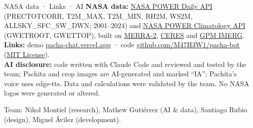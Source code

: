 \documentclass[10pt,a4paper]{article}
\newcommand{\enlace}[2]{\href{#1}{#2}}
\begin{document}
\begin{otherlanguage}{english}
\begin{tarjeta}[verde]{NASA data · Links · AI}
\small
\textbf{NASA data:} \enlace{https://power.larc.nasa.gov/docs/services/api/temporal/daily/}{NASA POWER Daily API}
(PRECTOTCORR, T2M\_MAX, T2M\_MIN, RH2M, WS2M, ALLSKY\_SFC\_SW\_DWN; 2001–2024) and
\enlace{https://power.larc.nasa.gov/docs/services/api/temporal/climatology/}{NASA POWER Climatology API} (GWETROOT, GWETTOP),
built on \enlace{https://gmao.gsfc.nasa.gov/reanalysis/MERRA-2/}{MERRA-2}, \enlace{https://ceres.larc.nasa.gov/}{CERES} and
\enlace{https://gpm.nasa.gov/data/imerg}{GPM IMERG}.\\[2pt]
\textbf{Links:} demo \enlace{https://pacha-chat.vercel.app}{pacha-chat.vercel.app} ·
code \enlace{https://github.com/M47H3W1/pacha-bot}{github.com/M47H3W1/pacha-bot} (\enlace{https://github.com/M47H3W1/pacha-bot/blob/develop/LICENSE}{MIT License}).\\[2pt]
\textbf{AI disclosure:} code written with Claude Code and reviewed and tested by the team; Pachita and crop images are AI-generated
and marked “IA”; Pachita's voice uses edge-tts. Data and calculations were validated by the team. No NASA logos were generated or altered.
\end{tarjeta}

\vfill
{\footnotesize\color{tierra!80} Team: Nikol Montiel (research), Mathew Gutiérrez (AI \& data), Santiago Rubio (design), Miguel Ávilez (development).}
\end{otherlanguage}
\end{document}
